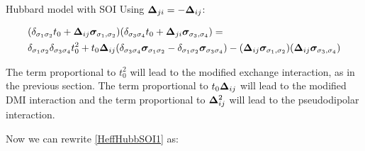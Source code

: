 \begin{section}{Hubbard model with SOI}
Using $\boldsymbol{\Delta}_{ji} = - \boldsymbol{\Delta}_{ij}$:

\begin{align*}
&(\delta_{\sigma_1 \sigma_2}t_0+\boldsymbol{\Delta}_{ij} \boldsymbol{\sigma}_{\sigma_1, \sigma_2}) (\delta_{\sigma_3 \sigma_4}t_0+\boldsymbol{\Delta}_{ji} \boldsymbol{\sigma}_{\sigma_3, \sigma_4}) = \\ 
&\delta_{\sigma_1 \sigma_2}\delta_{\sigma_3 \sigma_4}t_0^2 + t_0\boldsymbol{\Delta}_{ij}(\delta_{\sigma_3 \sigma_4} \boldsymbol{\sigma}_{\sigma_1 \sigma_2} - \delta_{\sigma_1 \sigma_2} \boldsymbol{\sigma}_{\sigma_3 \sigma_4}) - (\boldsymbol{\Delta}_{ij}\boldsymbol{\sigma}_{\sigma_1, \sigma_2})(\boldsymbol{\Delta}_{ij}\boldsymbol{\sigma}_{\sigma_3, \sigma_4})
\end{align*}

The term proportional to $t_0^2$ will lead to the modified exchange interaction, as in the previous section. The term proportional to $t_0\boldsymbol{\Delta}_{ij}$ will lead to the modified DMI interaction and the term proportional to $\boldsymbol{\Delta}_{ij}^2$ will lead to the pseudodipolar interaction.

Now we can rewrite \ref{HeffHubbSOI1} as:


\end{section}

